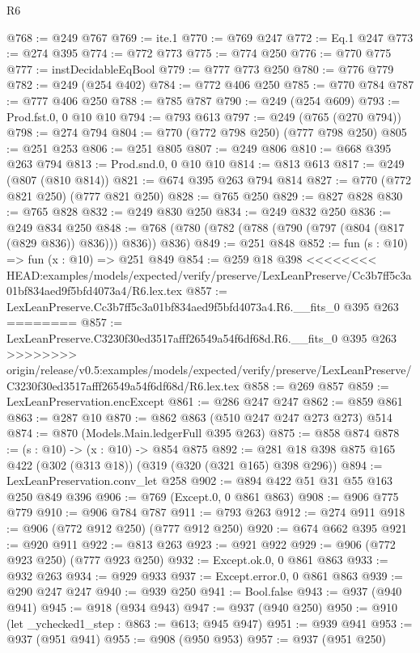 \begin{lexlean}{R6}
\begin{coremodule}
{{{{{{{{{{{{{{{@768 := @249 @767
@769 := ite.{1}
@770 := @769 @247
@772 := Eq.{1} @247
@773 := @274 @395
@774 := @772 @773
@775 := @774 @250
@776 := @770 @775
@777 := instDecidableEqBool
@779 := @777 @773 @250
@780 := @776 @779
@782 := @249 (@254 @402)
@784 := @772 @406 @250
@785 := @770 @784
@787 := @777 @406 @250
@788 := @785 @787
@790 := @249 (@254 @609)
@793 := Prod.fst.{0, 0} @10 @10
@794 := @793 @613
@797 := @249 (@765 (@270 @794))
@798 := @274 @794
@804 := @770 (@772 @798 @250) (@777 @798 @250)
@805 := @251 @253
@806 := @251 @805
@807 := @249 @806
@810 := @668 @395 @263 @794
@813 := Prod.snd.{0, 0} @10 @10
@814 := @813 @613
@817 := @249 (@807 (@810 @814))
@821 := @674 @395 @263 @794 @814
@827 := @770 (@772 @821 @250) (@777 @821 @250)
@828 := @765 @250
@829 := @827 @828
@830 := @765 @828
@832 := @249 @830 @250
@834 := @249 @832 @250
@836 := @249 @834 @250
@848 := @768 (@780 (@782 (@788 (@790 (@797 (@804 (@817 (@829 @836)) @836))) @836)) @836)
@849 := @251 @848
@852 := fun (s : @10) => fun (x : @10) => @251 @849
@854 := @259 @18 @398
<<<<<<<< HEAD:examples/models/expected/verify/preserve/LexLeanPreserve/Cc3b7ff5c3a01bf834aed9f5bfd4073a4/R6.lex.tex
@857 := LexLeanPreserve.Cc3b7ff5c3a01bf834aed9f5bfd4073a4.R6.__fits_0 @395 @263
========
@857 := LexLeanPreserve.C3230f30ed3517afff26549a54f6df68d.R6.__fits_0 @395 @263
>>>>>>>> origin/release/v0.5:examples/models/expected/verify/preserve/LexLeanPreserve/C3230f30ed3517afff26549a54f6df68d/R6.lex.tex
@858 := @269 @857
@859 := LexLeanPreservation.encExcept
@861 := @286 @247 @247
@862 := @859 @861
@863 := @287 @10
@870 := @862 @863 (@510 @247 @247 @273 @273) @514
@874 := @870 (Models.Main.ledgerFull @395 @263)
@875 := @858 @874
@878 := (s : @10) -> (x : @10) -> @854 @875
@892 := @281 @18 @398 @875 @165 @422 (@302 (@313 @18)) (@319 (@320 (@321 @165) @398 @296))
@894 := LexLeanPreservation.conv_let @258
@902 := @894 @422 @51 @31 @55 @163 @250 @849 @396
@906 := @769 (Except.{0, 0} @861 @863)
@908 := @906 @775 @779
@910 := @906 @784 @787
@911 := @793 @263
@912 := @274 @911
@918 := @906 (@772 @912 @250) (@777 @912 @250)
@920 := @674 @662 @395
@921 := @920 @911
@922 := @813 @263
@923 := @921 @922
@929 := @906 (@772 @923 @250) (@777 @923 @250)
@932 := Except.ok.{0, 0} @861 @863
@933 := @932 @263
@934 := @929 @933
@937 := Except.error.{0, 0} @861 @863
@939 := @290 @247 @247
@940 := @939 @250
@941 := Bool.false
@943 := @937 (@940 @941)
@945 := @918 (@934 @943)
@947 := @937 (@940 @250)
@950 := @910 (let _ychecked1_step : @863 := @613; @945 @947)
@951 := @939 @941
@953 := @937 (@951 @941)
@955 := @908 (@950 @953)
@957 := @937 (@951 @250)
}}}}}}}}}}}}}}}
\end{coremodule}
\end{lexlean}
